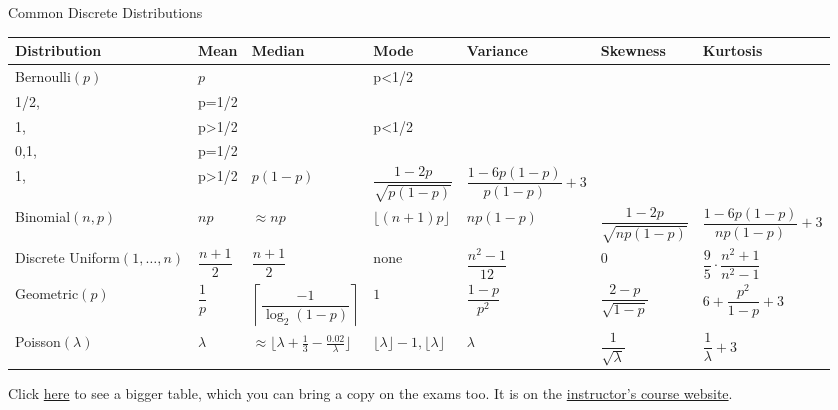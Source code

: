 \begin{frame}{Common Discrete Distributions}

\scriptsize

\renewcommand{\arraystretch}{1.45}

\begin{center}
\begin{tabular}{p{2.1cm} p{1.7cm} p{1.7cm} p{1.8cm} p{1.8cm} p{1.8cm} p{1.8cm}}
\toprule
\textbf{Distribution}
&
\textbf{Mean}
&
\textbf{Median}
&
\textbf{Mode}
&
\textbf{Variance}
&
\textbf{Skewness}
&
\textbf{Kurtosis}
\\
\midrule

Bernoulli\((p)\)
&
\(p\)
&
\(\begin{cases}
0,& p<1/2\\
1/2,& p=1/2\\
1,& p>1/2
\end{cases}\)
&
\(\begin{cases}
0,& p<1/2\\
0,1,& p=1/2\\
1,& p>1/2
\end{cases}\)
&
\(p(1-p)\)
&
\(
\dfrac{1-2p}{\sqrt{p(1-p)}}
\)
&
\(
\dfrac{1-6p(1-p)}{p(1-p)}+3
\)
\\

\midrule

Binomial\((n,p)\)
&
\(np\)
&
\(\approx np\)
&
\(\lfloor (n+1)p \rfloor\)
&
\(np(1-p)\)
&
\(
\dfrac{1-2p}{\sqrt{np(1-p)}}
\)
&
\(
\dfrac{1-6p(1-p)}{np(1-p)}+3
\)
\\

\midrule

Discrete Uniform\((1,\dots,n)\)
&
\(
\dfrac{n+1}{2}
\)
&
\(
\dfrac{n+1}{2}
\)
&
none
&
\(
\dfrac{n^2-1}{12}
\)
&
\(0\)
&
\(
\dfrac{9}{5}
\cdot
\dfrac{n^2+1}{n^2-1}
\)
\\

\midrule

Geometric\((p)\)
&
\(\dfrac1p\)
&
\(
\left\lceil
\dfrac{-1}{\log_2(1-p)}
\right\rceil
\)
&
\(1\)
&
\(
\dfrac{1-p}{p^2}
\)
&
\(
\dfrac{2-p}{\sqrt{1-p}}
\)
&
\(
6+\dfrac{p^2}{1-p}+3
\)
\\

\midrule

Poisson\((\lambda)\)
&
\(\lambda\)
&
\(\approx \lfloor\lambda+\frac13-\frac{0.02}{\lambda} \rfloor\)
&
\(\lfloor \lambda \rfloor  -1 , \lfloor \lambda \rfloor\) 
&
\(\lambda\)
&
\(
\dfrac1{\sqrt{\lambda}}
\)
&
\(
\dfrac1{\lambda}+3
\)
\\

\bottomrule
\end{tabular}
\end{center}

Click \href{https://armanjg.github.io/MATH-394-Probability-1-v2/distributions-v1.pdf}{here} to see a bigger table, which you can bring a copy on the exams too. It is on the \href{https://armanjg.github.io/MATH-394-Probability-1-v2/}{instructor's course website}.
\end{frame}



